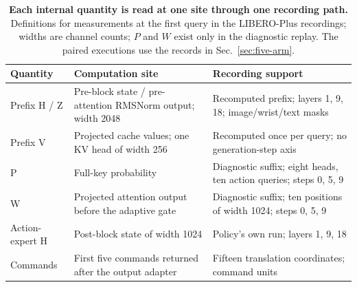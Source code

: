 \begin{table}[t]
\caption{\textbf{Each internal quantity is read at one site through one recording path.} Definitions for measurements at the first query in the LIBERO-Plus recordings; widths are channel counts; $P$ and $W$ exist only in the diagnostic replay. The paired executions use the records in Sec.~\ref{sec:five-arm}.}
\centering\small
\begin{tabular}{p{}p{}p{}}
\toprule
Quantity & Computation site & Recording support\\\midrule
Prefix H / Z & Pre-block state / pre-attention RMSNorm output; width 2048 & Recomputed prefix; layers 1, 9, 18; image/wrist/text masks\\
Prefix V & Projected cache values; one KV head of width 256 & Recomputed once per query; no generation-step axis\\
P & Full-key probability & Diagnostic suffix; eight heads, ten action queries; steps 0, 5, 9\\
W & Projected attention output before the adaptive gate & Diagnostic suffix; ten positions of width 1024; steps 0, 5, 9\\
Action-expert H & Post-block state of width 1024 & Policy's own run; layers 1, 9, 18\\
Commands & First five commands returned after the output adapter & Fifteen translation coordinates; command units\\\bottomrule
\end{tabular}

\label{tab:recording-roles}
\end{table}

